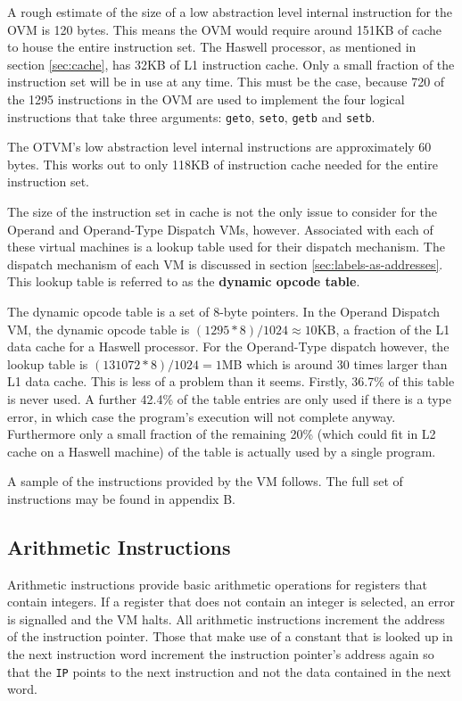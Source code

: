 \documentclass[english,a4paper,12pt]{report}
\begin{document}
A rough estimate of the size of a low abstraction level
\cite{Brunthaler20093} internal instruction for the OVM is 120
bytes. This means the OVM would require around 151KB of cache to house
the entire instruction set. The Haswell processor, as mentioned in
section \ref{sec:cache}, has 32KB of L1 instruction cache. Only a
small fraction of the instruction set will be in use at any time. This
must be the case, because 720 of the 1295 instructions in the OVM are
used to implement the four logical instructions that take three
arguments: \verb|geto|, \verb|seto|, \verb|getb| and \verb|setb|.

The OTVM's low abstraction level internal instructions are
approximately 60 bytes. This works out to only 118KB of instruction
cache needed for the entire instruction set.

The size of the instruction set in cache is not the only issue to
consider for the Operand and Operand-Type Dispatch VMs,
however. Associated with each of these virtual machines is a lookup
table used for their dispatch mechanism. The dispatch mechanism of
each VM is discussed in section \ref{sec:labels-as-addresses}. This
lookup table is referred to as the \textbf{dynamic opcode table}.

The dynamic opcode table is a set of 8-byte pointers. In the Operand
Dispatch VM, the dynamic opcode table is $(1295*8)/1024 \approx 10$KB, a
fraction of the L1 data cache for a Haswell processor. For the
Operand-Type dispatch however, the lookup table is
$(131072*8)/1024 = 1$MB which is around 30 times larger than L1 data
cache. This is less of a problem than it seems. Firstly, 36.7\% of
this table is never used. A further 42.4\% of the table entries are
only used if there is a type error, in which case the program's
execution will not complete anyway. Furthermore only a small fraction
of the remaining 20\% (which could fit in L2 cache on a Haswell
machine) of the table is actually used by a single program.

A sample of the instructions provided by the VM follows. The full set
of instructions may be found in appendix B.

\subsection{Arithmetic Instructions}

Arithmetic instructions provide basic arithmetic operations for
registers that contain integers. If a register that does not contain
an integer is selected, an error is signalled and the VM halts. All
arithmetic instructions increment the address of the instruction
pointer. Those that make use of a constant that is looked up in the
next instruction word increment the instruction pointer's address
again so that the \verb|IP| points to the next instruction and not the
data contained in the next word.
\end{document}
